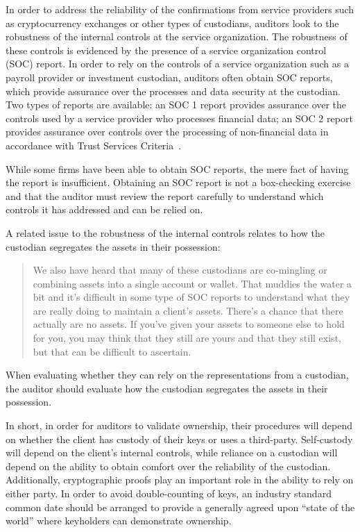 In order to address the reliability of the confirmations from service providers such as cryptocurrency exchanges or other types of custodians, auditors look to the robustness of the internal controls at the service organization. The robustness of these controls is evidenced by the presence of a service organization control (SOC) report. In order to rely on the controls of a service organization such as a payroll provider or investment custodian, auditors often obtain SOC reports, which provide assurance over the processes and data security at the custodian. Two types of reports are available: an SOC 1 report provides assurance over the controls used by a service provider who processes financial data; an SOC 2 report provides assurance over controls over the processing of non-financial data in accordance with Trust Services Criteria~\cite{bdosocreports}. 

While some firms have been able to obtain SOC reports, the mere fact of having the report is insufficient. Obtaining an SOC report is not a box-checking exercise and that the auditor must review the report carefully to understand which controls it has addressed and can be relied on.

A related issue to the robustness of the internal controls relates to how the custodian segregates the assets in their possession: 

\begin{quote}
We also have heard that many of these custodians are co-mingling or combining assets into a single account or wallet. That muddies the water a bit and it's difficult in some type of SOC reports to understand what they are really doing to maintain a client's assets. There's a chance that there actually are no assets. If you've given your assets to someone else to hold for you, you may think that they still are yours and that they still exist, but that can be difficult to ascertain.
\end{quote}

When evaluating whether they can rely on the representations from a custodian, the auditor should evaluate how the custodian segregates the assets in their possession. 

In short, in order for auditors to validate ownership, their procedures will depend on whether the client has custody of their keys or uses a third-party. Self-custody will depend on the client's internal controls, while reliance on a custodian will depend on the ability to obtain comfort over the reliability of the custodian. Additionally, cryptographic proofs play an important role in the ability to rely on either party. In order to avoid double-counting of keys, an industry standard common date should be arranged to provide a generally agreed upon ``state of the world'' where keyholders can demonstrate ownership. 

